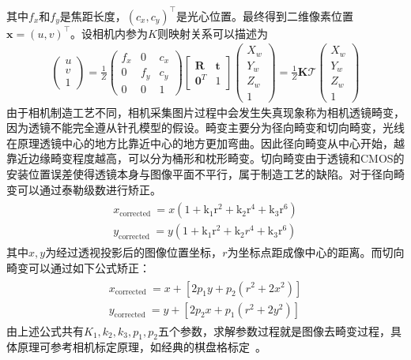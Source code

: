 其中$f_x$和$f_y$是焦距长度，$\left(c_{x}, c_{y}\right)^{\top}$是光心位置。最终得到二维像素位置$\boldsymbol{x}=(u, v)^{\top}$。设相机内参为$K$则映射关系可以描述为
\begin{align}
\left(\begin{array}{c}
u \\
v \\
1
\end{array}\right)=\frac{1}{Z}\left(\begin{array}{ccc}
f_{x} & 0 & c_{x} \\
0 & f_{y} & c_{y} \\
0 & 0 & 1
\end{array}\right)\left[\begin{array}{cc}
\boldsymbol{R} & \boldsymbol{t} \\
\mathbf{0}^{T} & 1
\end{array}\right]\left(\begin{array}{c}
X_{w} \\
Y_{w} \\
Z_{w} \\
1
\end{array}\right)=\frac{1}{Z} \boldsymbol{K} \mathcal{T}\left(\begin{array}{c}
X_{w} \\
Y_{w} \\
Z_{w} \\
1
\end{array}\right)
\end{align}
由于相机制造工艺不同，相机采集图片过程中会发生失真现象称为相机透镜畸变，因为透镜不能完全遵从针孔模型的假设。畸变主要分为径向畸变和切向畸变，光线在原理透镜中心的地方比靠近中心的地方更加弯曲。因此径向畸变从中心开始，越靠近边缘畸变程度越高，可以分为桶形和枕形畸变。切向畸变由于透镜和CMOS的安装位置误差使得透镜本身与图像平面不平行，属于制造工艺的缺陷。对于径向畸变可以通过泰勒级数进行矫正。
\begin{align}
\begin{array}{l}
x_{\text {corrected }}=x\left(1+\mathrm{k}_{1} \mathrm{r}^{2}+\mathrm{k}_{2} \mathrm{r}^{4}+\mathrm{k}_{3} \mathrm{r}^{6}\right) \\
y_{\text {corrected }}=y\left(1+\mathrm{k}_{1} \mathrm{r}^{2}+\mathrm{k}_{2} r^{4}+\mathrm{k}_{3} \mathrm{r}^{6}\right)
\end{array}
\end{align}
其中$x,y$为经过透视投影后的图像位置坐标，$r$为坐标点距成像中心的距离。而切向畸变可以通过如下公式矫正：
\begin{align}
\begin{array}{l}
x_{\text {corrected }}=x+\left[2 p_{1} y+p_{2}\left(r^{2}+2 x^{2}\right)\right] \\
y_{\text {corrected }}=y+\left[2 p_{2} x+p_{1}\left(r^{2}+2 y^{2}\right)\right]
\end{array}
\end{align}
由上述公式共有$K_1,k_2,k_3,p_1,p_2$五个参数，求解参数过程就是图像去畸变过程，具体原理可参考相机标定原理，如经典的棋盘格标定~\cite{888718}。

